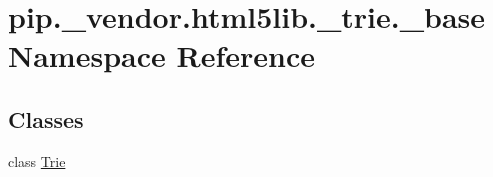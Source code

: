 \hypertarget{namespacepip_1_1__vendor_1_1html5lib_1_1__trie_1_1__base}{}\section{pip.\+\_\+vendor.\+html5lib.\+\_\+trie.\+\_\+base Namespace Reference}
\label{namespacepip_1_1__vendor_1_1html5lib_1_1__trie_1_1__base}
\subsection*{Classes}
\begin{DoxyCompactItemize}
\item 
class \hyperlink{classpip_1_1__vendor_1_1html5lib_1_1__trie_1_1__base_1_1Trie}{Trie}
\end{DoxyCompactItemize}
